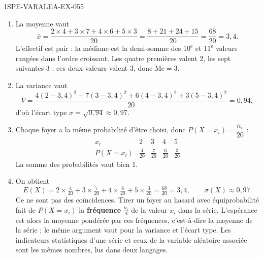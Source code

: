 \begin{corrige}{1SPE-VARALEA-EX-055}
\begin{enumerate}
\item La moyenne vaut
  \[
    \bar{x} = \frac{2\times4 + 3\times7 + 4\times6 + 5\times3}{20}
    = \frac{8 + 21 + 24 + 15}{20} = \frac{68}{20} = 3{,}4.
  \]
  L'effectif est pair : la médiane est la demi-somme des $10^{\text{e}}$ et
  $11^{\text{e}}$ valeurs rangées dans l'ordre croissant. Les quatre premières
  valent $2$, les sept suivantes $3$ : ces deux valeurs valent $3$, donc
  $\mathrm{Me} = 3$.

\item La variance vaut
  \[
    V = \frac{4(2-3{,}4)^2 + 7(3-3{,}4)^2 + 6(4-3{,}4)^2 + 3(5-3{,}4)^2}{20}
    = 0{,}94,
  \]
  d'où l'écart type $\sigma = \sqrt{0{,}94} \approx 0{,}97$.

\item Chaque foyer a la même probabilité d'être choisi, donc
  $P(X = x_i) = \dfrac{n_i}{20}$ :
  \[
  \begin{array}{c|cccc}
    x_i & 2 & 3 & 4 & 5 \\
    \hline
    P(X = x_i) & \frac{4}{20} & \frac{7}{20} & \frac{6}{20} & \frac{3}{20}
  \end{array}
  \]
  La somme des probabilités vaut bien $1$.

\item On obtient
  \[
    E(X) = 2\times\tfrac{4}{20} + 3\times\tfrac{7}{20} + 4\times\tfrac{6}{20}
    + 5\times\tfrac{3}{20} = \tfrac{68}{20} = 3{,}4,
    \qquad \sigma(X) \approx 0{,}97.
  \]
  Ce ne sont pas des coïncidences. Tirer un foyer au hasard avec équiprobabilité
  fait de $P(X = x_i)$ la \textbf{fréquence} $\frac{n_i}{N}$ de la valeur $x_i$
  dans la série. L'espérance est alors la moyenne pondérée par ces fréquences,
  c'est-à-dire la moyenne de la série ; le même argument vaut pour la variance
  et l'écart type. Les indicateurs statistiques d'une série et ceux de la
  variable aléatoire associée sont les mêmes nombres, lus dans deux langages.
\end{enumerate}
\end{corrige}

